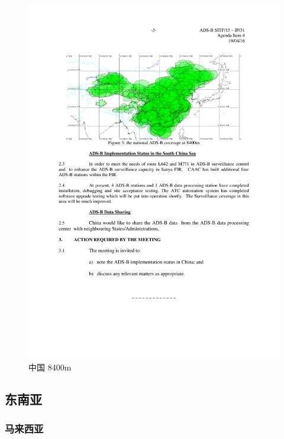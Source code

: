 \begin{figure}[htbp]
\centering
\includegraphics[width=12cm]{pic/china_8400m.pdf}
\caption{中国 8400m }
\label{fig:china_8400m}
\end{figure}

\subsection{东南亚}

\subsubsection{马来西亚}

